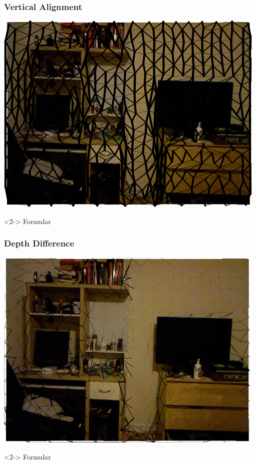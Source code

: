 \documentclass[final,ignorenonframetext,compress]{beamer}
\begin{document}
    \begin{frame}
        \frametitle{Vertical Alignment}
        \begin{center}
            \includegraphics[width=.8\linewidth]{images/00062_pipline_feature_pairwise_4}
        \end{center}
        \begin{visibleenv}<2->
            Formular %
        \end{visibleenv}
    \end{frame}

    \begin{frame}
        \frametitle{Depth Difference}
        \begin{center}
            \includegraphics[width=.8\linewidth]{images/00062_pipline_feature_pairwise_2}
        \end{center}
        \begin{visibleenv}<2->
            Formular %
        \end{visibleenv}
    \end{frame}
    
\end{document}
